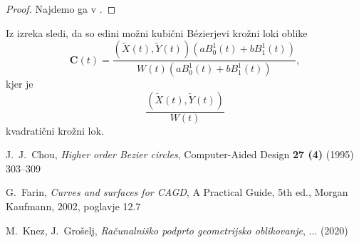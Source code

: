\documentclass[a4paper,11pt]{article}
\theoremstyle{definition}
\theoremstyle{plain}
\begin{document}
\begin{proof}
Najdemo ga v \cite{chou}.
\end{proof}

Iz izreka sledi, da so edini možni kubični B\'ezierjevi krožni loki oblike
$$\boldsymbol{C}(t)=\frac{(\tilde{X}(t),\tilde{Y}(t))(aB_0^1(t)+bB_1^1(t))}{W(t)(aB_0^1(t)+bB_1^1(t))},$$
kjer je $$\frac{(\tilde{X}(t),\tilde{Y}(t))}{W(t)}$$
kvadratični krožni lok.

\begin{thebibliography}{99}
J.~J.~Chou, \emph{Higher order Bezier circles}, Computer-Aided Design \textbf{27 (4)} (1995) 303--309

G.~Farin, \emph{Curves and surfaces for CAGD}, A Practical Guide, 5th ed., Morgan Kaufmann, 2002, poglavje 12.7

M.~Knez, J.~Grošelj, \emph{Računalniško podprto geometrijsko oblikovanje}, ... (2020)
\end{thebibliography}
\end{document}

